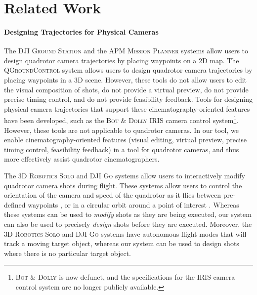 \section{Related Work}

\paragraph{Designing Trajectories for Physical Cameras}
The \textsc{DJI Ground Station} \cite{dji:2015} and the \textsc{APM Mission Planner} \cite{apm:2015} systems allow users to design quadrotor camera trajectories by placing waypoints on a 2D map.
The \textsc{QGroundControl} system \cite{meier:2012} allows users to design quadrotor camera trajectories by placing waypoints in a 3D scene.
However, these tools do not allow users to edit the visual composition of shots, do not provide a virtual preview, do not provide precise timing control, and do not provide feasibility feedback.
Tools for designing physical camera trajectories that support these cinematography-oriented features have been developed, such as the \textsc{Bot \& Dolly IRIS} camera control system\footnote{\textsc{Bot \& Dolly} is now defunct, and the specifications for the \textsc{IRIS} camera control system are no longer publicly available.}.
However, these tools are not applicable to quadrotor cameras.
In our tool, we enable cinematography-oriented features (visual editing, virtual preview, precise timing control, feasibility feedback) in a tool for quadrotor cameras, and thus more effectively assist quadrotor cinematographers.

The \textsc{3D Robotics Solo} \cite{3drobotics:2015} and \textsc{DJI Go} \cite{dji:2015a} systems allow users to interactively modify quadrotor camera shots during flight.
These systems allow users to control the orientation of the camera and speed of the quadrotor as it flies between pre-defined waypoints \cite{3drobotics:2015}, or in a circular orbit around a point of interest \cite{dji:2015a}.
Whereas these systems can be used to \emph{modify} shots as they are being executed, our system can also be used to precisely \emph{design} shots before they are executed.
Moreover, the \textsc{3D Robotics Solo} and \textsc{DJI Go} systems have autonomous flight modes that will track a moving target object, whereas our system can be used to design shots where there is no particular target object.

